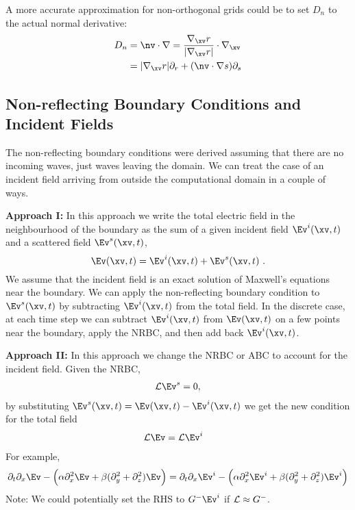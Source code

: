 A more accurate approximation for non-orthogonal grids 
could be to set $D_n$ to the actual normal derivative:
\begin{align*}
D_n & = \nv\cdot\grad = { \grad_\xv r \over \vert \grad_\xv r \vert} \cdot\grad_\xv  \\
    & = \vert \grad_\xv r \vert \partial_r + (\nv\cdot \grad s) \partial_s 
\end{align*} 


\subsection{Non-reflecting Boundary Conditions and Incident Fields}


The non-reflecting boundary conditions were derived assuming that there are no incoming waves, just
waves leaving the domain. We can treat the case of an incident field arriving from outside the computational
domain in a couple of ways. 

{\bf Approach I:} In this approach 
 we write the total electric field in the neighbourhood of the boundary as the sum of a given incident
field $\Ev^i(\xv,t)$ and a scattered field $\Ev^s(\xv,t)$,
\[
  \Ev(\xv,t) = \Ev^i(\xv,t) + \Ev^s(\xv,t) ~.
\]
We assume that the incident field is an exact solution of Maxwell's equations near the boundary. 
We can apply the non-reflecting boundary condition to $\Ev^s(\xv,t)$ by subtracting $\Ev^i(\xv,t)$ from
the total field. In the discrete case, at each time step we can subtract $\Ev^i(\xv,t)$ from $\Ev(\xv,t)$ 
on a few points near the boundary, apply the NRBC, and then add back $\Ev^i(\xv,t)$. 

{\bf Approach II:} In this approach we change the NRBC or ABC to account for the incident field.
Given the NRBC,
\begin{align}
  \Lc \Ev^s = 0,
\end{align}
by substituting $ \Ev^s(\xv,t) = \Ev(\xv,t) - \Ev^i(\xv,t)$ 
we get the new condition for the total field
\begin{align}
  \Lc \Ev &=  \Lc \Ev^i
\end{align}
For example, 
\begin{align}
 \partial_t\partial_x \Ev -\Big( \alpha \partial_x^2 \Ev + \beta (\partial_y^2+\partial_z^2) \Ev \Big) = 
 \partial_t\partial_x \Ev^i -\Big( \alpha \partial_x^2 \Ev^i + \beta (\partial_y^2+\partial_z^2) \Ev^i  \Big)
\end{align}
Note: We could potentially set the RHS to $G^{-}\Ev^i$ if ${\mathcal L} \approx G^{-}$. 
